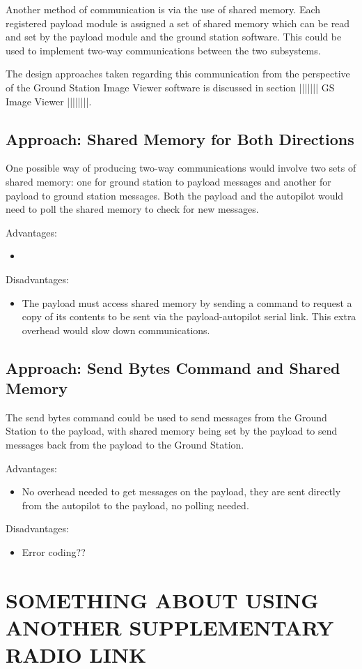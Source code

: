 Another method of communication is via the use of shared memory. Each registered payload module is assigned a set of shared memory which can be read and set by the payload module and the ground station software. This could be used to implement two-way communications between the two subsystems.

The design approaches taken regarding this communication from the perspective of the Ground Station Image Viewer software is discussed in section ||||||| GS Image Viewer ||||||||.

\subsection{Approach: Shared Memory for Both Directions}
One possible way of producing two-way communications would involve two sets of shared memory: one for ground station to payload messages and another for payload to ground station messages. Both the payload and the autopilot would need to poll the shared memory to check for new messages.

Advantages:
\begin{itemize}
\item 
\end{itemize}

Disadvantages:
\begin{itemize}
\item The payload must access shared memory by sending a command to request a copy of its contents to be sent via the payload-autopilot serial link. This extra overhead would slow down communications.
\end{itemize}


\subsection{Approach: Send Bytes Command and Shared Memory}
The send bytes command could be used to send messages from the Ground Station to the payload, with shared memory being set by the payload to send messages back from the payload to the Ground Station.

Advantages:
\begin{itemize}
\item No overhead needed to get messages on the payload, they are sent directly from the autopilot to the payload, no polling needed.
\end{itemize}

Disadvantages:
\begin{itemize}
\item Error coding??
\end{itemize}

\section{SOMETHING ABOUT USING ANOTHER SUPPLEMENTARY RADIO LINK}